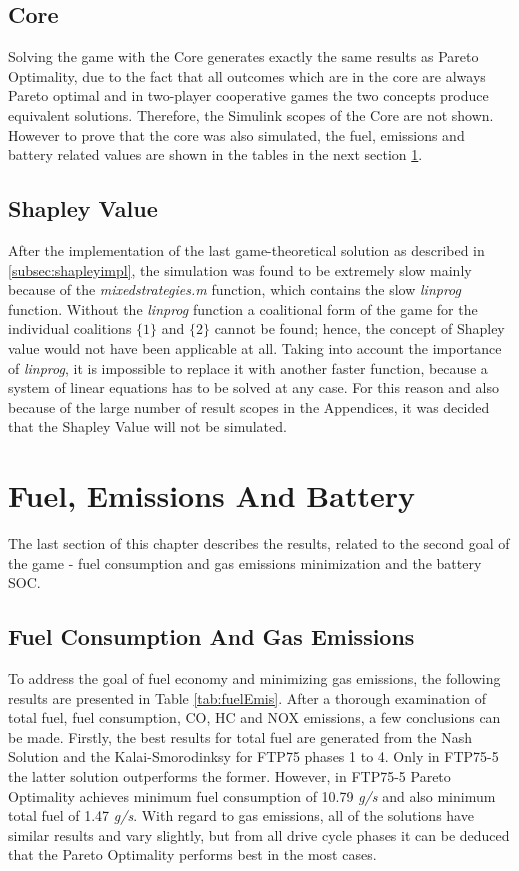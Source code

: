 \subsection{Core}
Solving the game with the Core generates exactly the same results as Pareto Optimality, due to the fact that all outcomes which are in the core are always Pareto optimal and in two-player cooperative games the two concepts produce equivalent solutions. Therefore, the Simulink scopes of the Core are not shown. However to prove that the core was also simulated, the fuel, emissions and battery related values are shown in the tables in the next section \ref{sec:goalresults}.

\subsection{Shapley Value}
After the implementation of the last game-theoretical solution as described in \ref{subsec:shapleyimpl}, the simulation was found to be extremely slow mainly because of the \textit{mixedstrategies.m} function, which contains the slow \textit{linprog} function. Without the \textit{linprog} function a coalitional form of the game for the individual coalitions $\{1\}$ and $\{2\}$ cannot be found; hence, the concept of Shapley value would not have been applicable at all. Taking into account the importance of \textit{linprog}, it is impossible to replace it with another faster function, because a system of linear equations has to be solved at any case. For this reason and also because of the large number of result scopes in the Appendices, it was decided that the Shapley Value will not be simulated.

\section{Fuel, Emissions And Battery}
\label{sec:goalresults}
The last section of this chapter describes the results, related to the second goal of the game - fuel consumption and gas emissions minimization and the battery SOC.

\subsection{Fuel Consumption And Gas Emissions}
To address the goal of fuel economy and minimizing gas emissions, the following results are presented in Table \ref{tab:fuelEmis}. After a thorough examination of total fuel, fuel consumption, CO, HC and NOX emissions, a few conclusions can be made. Firstly, the best results for total fuel are generated from the Nash Solution and the Kalai-Smorodinksy for FTP75 phases 1 to 4. Only in FTP75-5 the latter solution outperforms the former. However, in FTP75-5 Pareto Optimality achieves minimum fuel consumption of 10.79 \textit{g/s} and also minimum total fuel of 1.47 \textit{g/s}. With regard to gas emissions, all of the solutions have similar results and vary slightly, but from all drive cycle phases it can be deduced that the Pareto Optimality performs best in the most cases.

